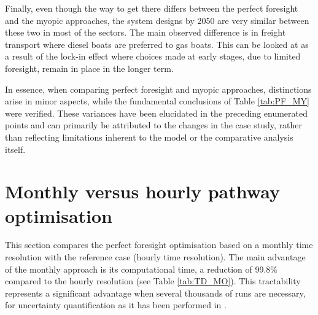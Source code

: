 Finally, even though the way to get there differs between the perfect foresight and the myopic approaches, the system designs by 2050 are very similar between these two in most of the sectors. The main observed difference is in freight transport where diesel boats are preferred to gas boats. This can be looked at as a result of the lock-in effect where choices made at early stages, due to limited foresight, remain in place in the longer term. 

In essence, when comparing perfect foresight and myopic approaches, distinctions arise in minor aspects, while the fundamental conclusions of Table \ref{tab:PF_MY} were verified. These variances have been elucidated in the preceding enumerated points and can primarily be attributed to the changes in the case study, rather than reflecting limitations inherent to the model or the comparative analysis itself.

\section{Monthly versus hourly pathway optimisation}
\label{app:mo_vs_td}

This section compares the perfect foresight optimisation based on a monthly time resolution with the reference case (hourly time resolution). The main advantage of the monthly approach is its computational time, \ie a reduction of 99.8\% compared to the hourly resolution (see Table \ref{tab:TD_MO}). This tractability represents a significant advantage when several thousands of runs are necessary, \eg for uncertainty quantification as it has been performed in \cite{rixhon2021role}.


